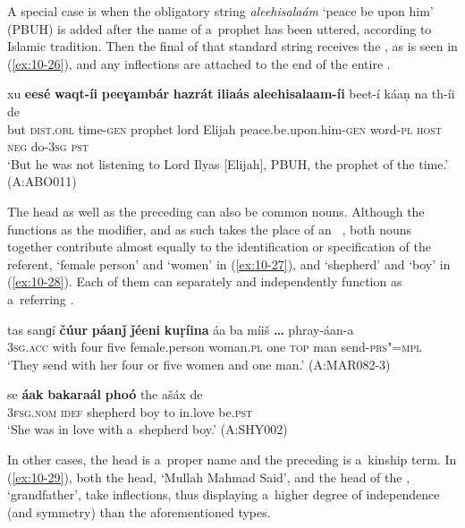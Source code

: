 A special case is when the obligatory string \textit{aleehisalaám} `peace be upon him' (PBUH) is added after the name of a~prophet has been uttered, according to Islamic tradition. Then the final  of that standard string receives the , as is seen in (\ref{ex:10-26}), and any inflections are attached to the end of the entire .

\begin{exe}
\ex
\label{ex:10-26}
\gll xu \textbf{eesé} \textbf{waqt-íi} \textbf{peeɣambár} \textbf{hazrát} \textbf{iliaás} \textbf{aleehisalaam-íi} beet-í káaṇ na th-íi de \\
but \textsc{dist.obl} time-\textsc{gen} prophet lord  Elijah peace.be.upon.him-\textsc{gen} 
word-\textsc{pl} \textsc{host} \textsc{neg} do-\textsc{3sg} \textsc{pst} \\
\glt `But he was not listening to Lord Ilyas [Elijah], PBUH, the prophet of the time.' (A:ABO011)
\end{exe}

The head as well as the preceding  can also be common nouns. Although the  functions as the modifier, and as such takes the place of an~ , both nouns together contribute almost equally to the identification or specification of the referent, `female person' and `women' in (\ref{ex:10-27}), and `shepherd' and `boy' in (\ref{ex:10-28}). Each of them can separately and independently function as a~referring  . 

\ea
\label{ex:10-27}
\gll tas sanɡí \textbf{čúur} \textbf{páanǰ} \textbf{ǰéeni} \textbf{kuṛíina} áa ba míiš \textbf{{\ldots}} phray-áan-a\\
\textsc{3sg.acc} with four five female.person woman.\textsc{pl} one \textsc{top} man {} send-\textsc{prs"=mpl}\\
\glt `They send with her four or five women and one man.' (A:MAR082-3)

\ex
\label{ex:10-28}
\gll se \textbf{áak} \textbf{bakaraál} \textbf{phoó} the ašáx de  \\
\textsc{3fsg.nom} \textsc{idef} shepherd boy to in.love be.\textsc{pst}  \\
\glt `She was in love with a~shepherd boy.' (A:SHY002)
\z

In other cases, the head is a~proper name and the preceding  is a~kinship term. In (\ref{ex:10-29}), both the  head, `Mullah Mahmad Said', and the head of the , `grandfather', take inflections, thus displaying a~higher degree of independence (and symmetry) than the aforementioned types. 


